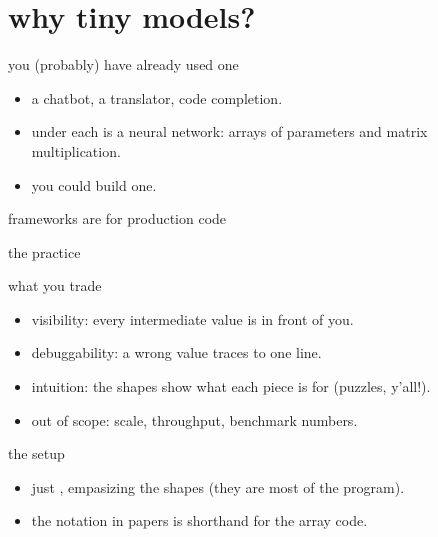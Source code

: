   \section{why tiny models?}
	\begin{frame}{you (probably) have already used one}
    \begin{itemize}
      \item a chatbot, a translator, code completion.
      \item under each is a neural network: arrays of parameters and matrix
				multiplication.
      \item \textcolor{mute}{you could build one.}
    \end{itemize}
  \end{frame}

  \begin{frame}{frameworks are for production code}
  \end{frame}

  \begin{frame}{the practice}
  \end{frame}

  \begin{frame}{what you trade}
    \begin{itemize}
      \item[\textcolor{cwTeal}{+}] visibility: every intermediate value is in front of you.
      \item[\textcolor{cwTeal}{+}] debuggability: a wrong value traces to one line.
      \item[\textcolor{cwTeal}{+}] intuition: the shapes show what each piece is
				for (puzzles, y’all!).
      \item[\textcolor{mute}{\textbar}] \textcolor{mute}{out of scope: scale, throughput, benchmark numbers.}
    \end{itemize}
  \end{frame}

  \begin{frame}{the setup}
    \begin{itemize}
      \item just , empasizing the shapes (they are
				most of the program).
      \item the notation in papers is shorthand for the array code.
    \end{itemize}
  \end{frame}

